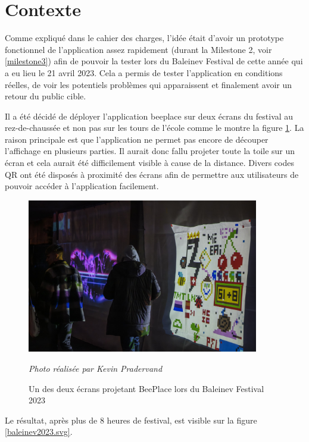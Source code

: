 \section{Contexte}

Comme expliqué dans le cahier des charges, l'idée était d'avoir un prototype fonctionnel de l'application assez rapidement (durant la Milestone 2, voir \ref{milestone3}) afin de pouvoir la tester lors du Baleinev Festival de cette année qui a eu lieu le 21 avril 2023. Cela a permis de tester l'application en conditions réelles, de voir les potentiels problèmes qui apparaissent et finalement avoir un retour du public cible.

Il a été décidé de déployer l'application \gls{beeplace} sur deux écrans du festival au rez-de-chaussée et non pas sur les tours de l'école comme le montre la figure \ref{fig:beeplace-baleinev-2023}. La raison principale est que l'application ne permet pas encore de découper l'affichage en plusieurs parties. Il aurait donc fallu projeter toute la toile sur un écran et cela aurait été difficilement visible à cause de la distance. Divers codes QR ont été disposés à proximité des écrans afin de permettre aux utilisateurs de pouvoir accéder à l'application facilement.

\begin{figure}[H]
  \centering
  \includegraphics[width=0.9\textwidth]{assets/figures/beeplace-baleinev-2023.jpg}
  \begin{center}
    \textit{Photo réalisée par Kevin Pradervand}
  \end{center}
  \caption{Un des deux écrans projetant BeePlace lors du Baleinev Festival 2023}
  \label{fig:beeplace-baleinev-2023}
\end{figure}

Le résultat, après plus de 8 heures de festival, est visible sur la figure \ref{baleinev2023.svg}.

